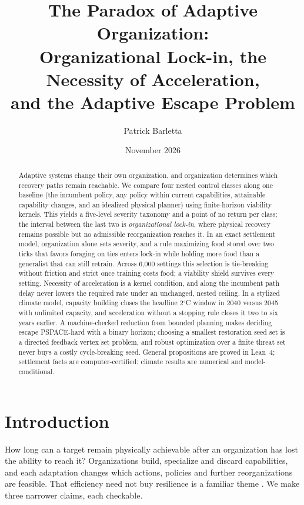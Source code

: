 \documentclass[11pt]{article}
\title{The Paradox of Adaptive Organization:\\
Organizational Lock-in, the Necessity of Acceleration,\\
and the Adaptive Escape Problem}
\author{Patrick Barletta}
\date{November 2026}
\theoremstyle{plain}
\theoremstyle{definition}
\begin{document}
\maketitle

\begin{abstract}
Adaptive systems change their own organization, and organization determines which recovery paths remain reachable. We compare four nested control classes along one baseline (the incumbent policy, any policy within current capabilities, attainable capability changes, and an idealized physical planner) using finite-horizon viability kernels. This yields a five-level severity taxonomy and a point of no return per class; the interval between the last two is \emph{organizational lock-in}, where physical recovery remains possible but no admissible reorganization reaches it. In an exact settlement model, organization alone sets severity, and a rule maximizing food stored over two ticks that favors foraging on ties enters lock-in while holding more food than a generalist that can still retrain. Across 6,000 settings this selection is tie-breaking without friction and strict once training costs food; a viability shield survives every setting. Necessity of acceleration is a kernel condition, and along the incumbent path delay never lowers the required rate under an unchanged, nested ceiling. In a stylized climate model, capacity building closes the headline 2$^\circ$C window in 2040 versus 2045 with unlimited capacity, and acceleration without a stopping rule closes it two to six years earlier. A machine-checked reduction from bounded planning makes deciding escape PSPACE-hard with a binary horizon; choosing a smallest restoration seed set is a directed feedback vertex set problem, and robust optimization over a finite threat set never buys a costly cycle-breaking seed. General propositions are proved in Lean~4; settlement facts are computer-certified; climate results are numerical and model-conditional.
\end{abstract}

\section{Introduction}
\label{sec:intro}

How long can a target remain physically achievable after an organization has lost the ability to reach it? Organizations build, specialize and discard capabilities, and each adaptation changes which actions, policies and further reorganizations are feasible. That efficiency need not buy resilience is a familiar theme \citep{LeonardBarton1992,March1991,RepenningSterman2002,CarlsonDoyle2002}. We make three narrower claims, each checkable.
\end{document}
